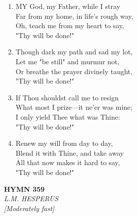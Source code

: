 \documentclass[11pt,a4paper]{article}
\begin{document}
\begin{enumerate}
    \item MY God, my Father, while I stray \\
        Far from my home, in life's rough way, \\
        Oh, teach me from my heart to say, \\
        "Thy will be done!"

    \item Though dark my path and sad my lot, \\
        Let me "be still" and murmur not, \\
        Or breathe the prayer divinely taught, \\
        "Thy will be done!"

    \item If Thou shouldst call me to resign \\
        What most I prize---it ne'er was mine; \\
        I only yield Thee what was Thine: \\
        "Thy will be done!"

    \item Renew my will from day to day, \\
        Blend it with Thine, and take away \\
        All that now makes it hard to say, \\
        "Thy will be done!"

\end{enumerate}

\newpage
\begin{center}
    {\Large \textbf{HYMN 359}}
    \\
    \textit{L.M. HESPERUS}
    \\
    \textit{\small [Moderately fast]}
\end{center}
\vspace{1em}
\end{document}
